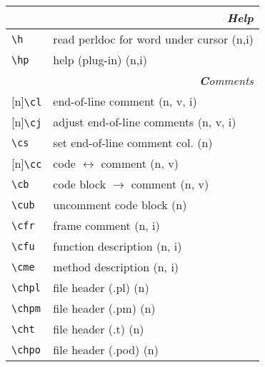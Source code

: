 \documentclass[oneside,10pt,landscape,DIV17]{scrartcl}
\newcommand{\Rep}{{\scriptsize{[n]}}}
\begin{document}
\begin{multicols}{3}
\begin{center}
\begin{tabular}[]{|p{11mm}|p{60mm}|}
\hline 
\multicolumn{2}{|r|}{\textsl{\textbf{H}elp}}\\[1.0ex]
\hline \verb'\h'    & read perldoc for word under cursor \hfill (n,i)\\
\hline \verb'\hp'   & help (plug-in) \hfill (n,i)\\
\hline 
\hline
\multicolumn{2}{|r|}{\textsl{\textbf{C}omments}}                       \\[1.0ex]
\hline \Rep\verb'\cl'   & end-of-line comment               \hfill (n, v, i)\\
\hline \Rep\verb'\cj'   & adjust end-of-line comments       \hfill (n, v, i)\\
\hline     \verb'\cs'   & set end-of-line comment col.      \hfill (n)      \\
%
\hline \Rep\verb'\cc'   & code $\leftrightarrow$ comment    \hfill (n, v)   \\
\hline     \verb'\cb'   & code block $\rightarrow$ comment  \hfill (n, v)   \\
\hline     \verb'\cub'  & uncomment code block              \hfill (n)      \\
%
\hline     \verb'\cfr'  & frame comment                     \hfill (n, i)   \\
\hline     \verb'\cfu'  & function description              \hfill (n, i)   \\
\hline     \verb'\cme'  & method description                \hfill (n, i)   \\
\hline     \verb'\chpl' & file header (.pl)                 \hfill (n)      \\
\hline     \verb'\chpm' & file header (.pm)                 \hfill (n)      \\
\hline     \verb'\cht'  & file header (.t)                  \hfill (n)      \\
\hline     \verb'\chpo' & file header (.pod)                \hfill (n)      \\

\end{tabular}
\end{center}
\end{multicols}
\end{document}
